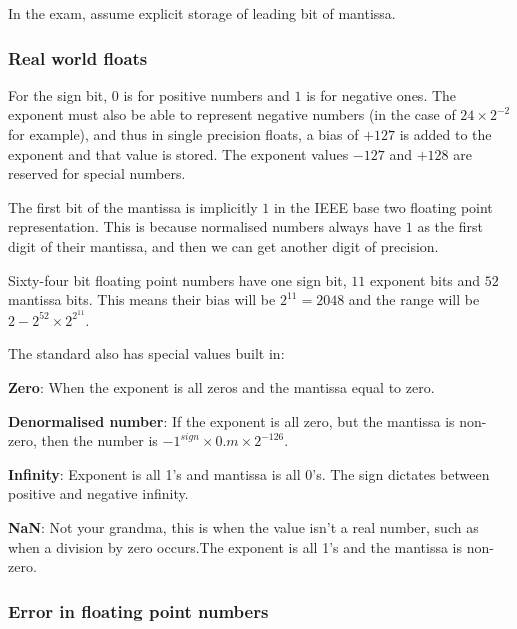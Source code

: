 
In the exam, assume explicit storage of leading bit of mantissa.

\subsubsection{Real world floats}


For the sign bit, $0$ is for positive numbers and $1$ is for negative ones. The
exponent must also be able to represent negative numbers (in the case of
$24\times2^{-2}$ for example), and thus in single precision floats, a bias of
$+127$ is added to the exponent and that value is stored. The exponent values
$-127$ and $+128$ are reserved for special numbers.

The first bit of the mantissa is implicitly $1$ in the IEEE base two floating
point representation. This is because normalised numbers always have $1$ as the
first digit of their mantissa, and then we can get another digit of precision.


Sixty-four bit floating point numbers have one sign bit, $11$ exponent bits and
$52$ mantissa bits. This means their bias will be $2^{11} = 2048$ and the range
will be $2 - 2^{52} \times 2^{2^{11}}$.

The standard also has special values built in:

\begin{description}
  \item \textbf{Zero}: When the exponent is all zeros and the mantissa equal to 
  zero.
  \item \textbf{Denormalised number}: If the exponent is all zero, but the
  mantissa is non-zero, then the number is
  $-1^{sign} \times 0.m\times 2^{-126}$.
  \item \textbf{Infinity}: Exponent is all 1's and mantissa is all 0's. The
  sign dictates between positive and negative infinity.
  \item \textbf{NaN}: Not your grandma, this is when the value isn't a real
  number, such as when a division by zero occurs.The exponent is all 1's and
  the mantissa is non-zero.
\end{description}

\subsubsection{Error in floating point numbers}

